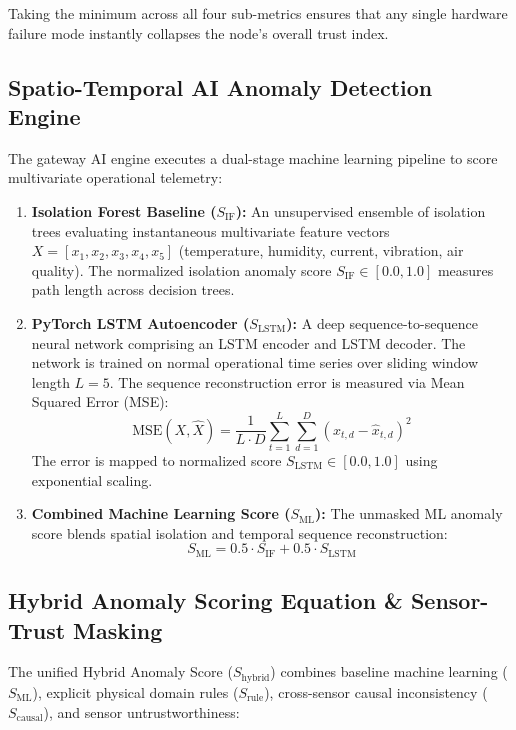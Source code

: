 \documentclass[conference]{IEEEtran}
\begin{document}
Taking the minimum across all four sub-metrics ensures that any single hardware failure mode instantly collapses the node's overall trust index.

\subsection{Spatio-Temporal AI Anomaly Detection Engine}
The gateway AI engine executes a dual-stage machine learning pipeline to score multivariate operational telemetry:

\begin{enumerate}
    \item \textbf{Isolation Forest Baseline ($S_{\text{IF}}$):} An unsupervised ensemble of isolation trees evaluating instantaneous multivariate feature vectors $X = [x_1, x_2, x_3, x_4, x_5]$ (temperature, humidity, current, vibration, air quality). The normalized isolation anomaly score $S_{\text{IF}} \in [0.0, 1.0]$ measures path length across decision trees.
    
    \item \textbf{PyTorch LSTM Autoencoder ($S_{\text{LSTM}}$):} A deep sequence-to-sequence neural network comprising an LSTM encoder and LSTM decoder. The network is trained on normal operational time series over sliding window length $L=5$. The sequence reconstruction error is measured via Mean Squared Error (MSE):
    \begin{equation}
    \text{MSE}(X, \hat{X}) = \frac{1}{L \cdot D} \sum_{t=1}^{L} \sum_{d=1}^{D} \left(x_{t,d} - \hat{x}_{t,d}\right)^2
    \end{equation}
    The error is mapped to normalized score $S_{\text{LSTM}} \in [0.0, 1.0]$ using exponential scaling.
    
    \item \textbf{Combined Machine Learning Score ($S_{\text{ML}}$):} The unmasked ML anomaly score blends spatial isolation and temporal sequence reconstruction:
    \begin{equation}
    S_{\text{ML}} = 0.5 \cdot S_{\text{IF}} + 0.5 \cdot S_{\text{LSTM}}
    \end{equation}
\end{enumerate}

\subsection{Hybrid Anomaly Scoring Equation \& Sensor-Trust Masking}
The unified Hybrid Anomaly Score ($S_{\text{hybrid}}$) combines baseline machine learning ($S_{\text{ML}}$), explicit physical domain rules ($S_{\text{rule}}$), cross-sensor causal inconsistency ($S_{\text{causal}}$), and sensor untrustworthiness:
\end{document}
